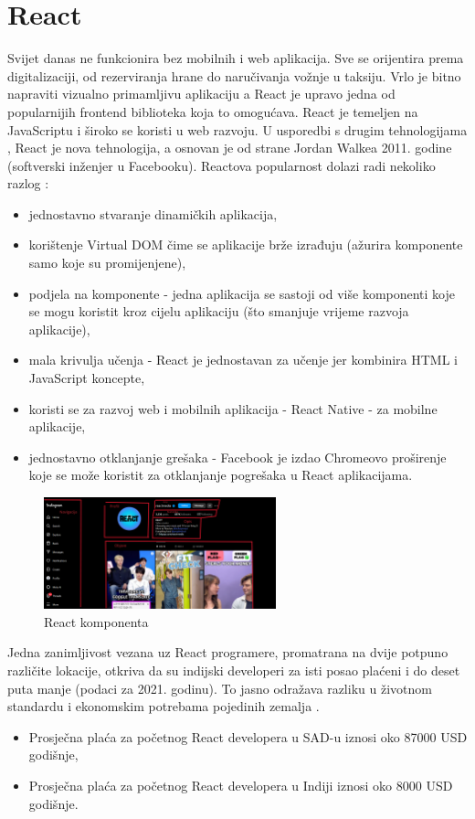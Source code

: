 \documentclass[]{foi}
\begin{document}
\section{React}

Svijet danas ne funkcionira bez mobilnih i web aplikacija. Sve se orijentira prema digitalizaciji, od rezerviranja hrane do naručivanja vožnje u taksiju. Vrlo je bitno napraviti vizualno
primamljivu aplikaciju a React je upravo jedna od popularnijih frontend biblioteka koja to omogućava. React je temeljen na JavaScriptu i široko se koristi u web razvoju. U usporedbi s drugim tehnologijama
, React je nova tehnologija, a osnovan je od strane Jordan Walkea 2011. godine (softverski inženjer u Facebooku). Reactova popularnost dolazi radi nekoliko razlog \cite{simplilearn2025react}:
\begin{itemize}
    \item jednostavno stvaranje dinamičkih aplikacija,
    \item korištenje Virtual DOM čime se aplikacije brže izrađuju (ažurira komponente samo koje su promijenjene),
    \item podjela na komponente - jedna aplikacija se sastoji od više komponenti koje se mogu koristit kroz cijelu aplikaciju (što smanjuje vrijeme razvoja aplikacije),
    \item mala krivulja učenja - React je jednostavan za učenje jer kombinira HTML i JavaScript koncepte,
    \item koristi se za razvoj web i mobilnih aplikacija - React Native - za mobilne aplikacije,
    \item jednostavno otklanjanje grešaka - Facebook je izdao Chromeovo proširenje koje se može koristit za otklanjanje pogrešaka u React aplikacijama.
\end{itemize}

\begin{figure}[ht!]
    \centering
    \includegraphics[width=0.6\textwidth]{./assets/components.png} 
    \caption{React komponenta}
    \label{fig:slika5}
\end{figure}


Jedna zanimljivost vezana uz React programere, promatrana na dvije potpuno različite lokacije, otkriva da su indijski developeri za isti posao plaćeni i do deset puta manje (podaci za 2021. godinu). 
To jasno odražava razliku u životnom standardu i ekonomskim potrebama pojedinih zemalja \cite{simplilearn2025react}.
\begin{itemize}
    \item Prosječna plaća za početnog React developera u SAD-u iznosi oko 87000 USD godišnje,
    \item Prosječna plaća za početnog React developera u Indiji iznosi oko 8000 USD godišnje.
\end{itemize}
\end{document}
